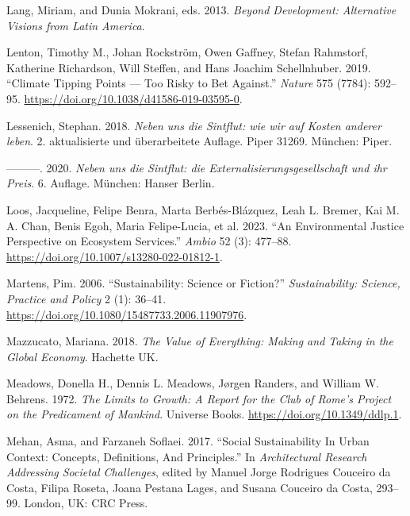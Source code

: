 \documentclass[
  a4paper,
  openany]{book}
\newlength{\cslhangindent}
\newenvironment{CSLReferences}[2] %
 {\begin{list}{}{%
  \setlength{\itemindent}{0pt}
  \setlength{\leftmargin}{0pt}
  \setlength{\parsep}{0pt}
  \ifodd #1
   \setlength{\leftmargin}{\cslhangindent}
   \setlength{\itemindent}{-1\cslhangindent}
  \fi
  \setlength{\itemsep}{#2\baselineskip}}}
 {\end{list}}
\begin{document}
\begin{CSLReferences}{1}{0}
Lang, Miriam, and Dunia Mokrani, eds. 2013. \emph{Beyond {Development}:
{Alternative} Visions from {Latin America}}.

Lenton, Timothy M., Johan Rockström, Owen Gaffney, Stefan Rahmstorf,
Katherine Richardson, Will Steffen, and Hans Joachim Schellnhuber. 2019.
{``Climate Tipping Points --- Too Risky to Bet Against.''} \emph{Nature}
575 (7784): 592--95. \url{https://doi.org/10.1038/d41586-019-03595-0}.

Lessenich, Stephan. 2018. \emph{{Neben uns die Sintflut: wie wir auf
Kosten anderer leben}}. 2. aktualisierte und {ü}berarbeitete Auflage.
{Piper} 31269. M{ü}nchen: Piper.

---------. 2020. \emph{{Neben uns die Sintflut: die
Externalisierungsgesellschaft und ihr Preis}}. 6. Auflage. M{ü}nchen:
Hanser Berlin.

Loos, Jacqueline, Felipe Benra, Marta Berbés-Blázquez, Leah L. Bremer,
Kai M. A. Chan, Benis Egoh, Maria Felipe-Lucia, et al. 2023. {``An
Environmental Justice Perspective on Ecosystem Services.''} \emph{Ambio}
52 (3): 477--88. \url{https://doi.org/10.1007/s13280-022-01812-1}.

Martens, Pim. 2006. {``Sustainability: Science or Fiction?''}
\emph{Sustainability: Science, Practice and Policy} 2 (1): 36--41.
\url{https://doi.org/10.1080/15487733.2006.11907976}.

Mazzucato, Mariana. 2018. \emph{The Value of Everything: {Making} and
Taking in the Global Economy}. Hachette UK.

Meadows, Donella H., Dennis L. Meadows, Jørgen Randers, and William W.
Behrens. 1972. \emph{The {Limits} to {Growth}: {A} Report for the {Club}
of {Rome}'s {Project} on the {Predicament} of {Mankind}}. Universe
Books. \url{https://doi.org/10.1349/ddlp.1}.

Mehan, Asma, and Farzaneh Soflaei. 2017. {``Social {Sustainability In
Urban Context}: {Concepts}, {Definitions}, {And Principles}.''} In
\emph{Architectural {Research Addressing Societal Challenges}}, edited
by Manuel Jorge Rodrigues Couceiro da Costa, Filipa Roseta, Joana
Pestana Lages, and Susana Couceiro da Costa, 293--99. London, UK: CRC
Press.


\end{CSLReferences}
\end{document}
